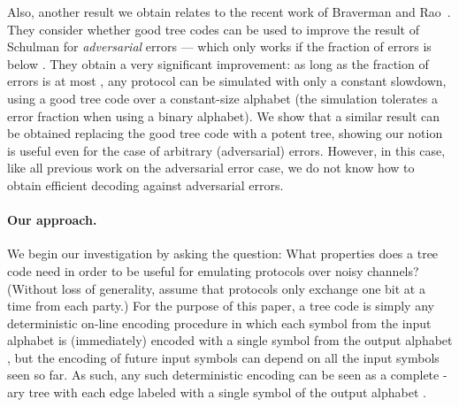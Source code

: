 \documentclass[ letterpaper, 11pt]{article}
\newcommand{\potent}{potent\xspace}
\begin{document}
Also, another result we obtain relates to the recent work of
Braverman and Rao~\cite{BR10}. They consider whether good tree codes
can be used to improve the result of Schulman for \emph{adversarial}
errors --- which only works if the fraction of errors is below
. They obtain a very significant improvement: as long as the
fraction of errors is at most , any protocol can be
simulated with only a constant slowdown, using a good tree code over
a constant-size alphabet (the simulation tolerates a 
error fraction when using a binary alphabet). We show that a similar
result can be obtained replacing the good tree code with a \potent
tree, showing our notion is useful even for the case of arbitrary
(adversarial) errors. However, in this case, like all previous work
on the adversarial error case, we do not know how to obtain
efficient decoding against adversarial errors.


\paragraph{Our approach.}
We begin our investigation by asking the question: What properties
does a tree code need in order to be useful for emulating protocols
over noisy channels?  (Without loss of generality, assume that
protocols only exchange one bit at a time from each party.) For the
purpose of this paper, a tree code is simply any deterministic
on-line encoding procedure in which each symbol from the input
alphabet  is (immediately) encoded with a single symbol from
the output alphabet , but the encoding of future input symbols
can depend on all the input symbols seen so far.  As such, any such
deterministic encoding can be seen as a complete -ary tree
with each edge labeled with a single symbol of the output alphabet
.
\end{document}
